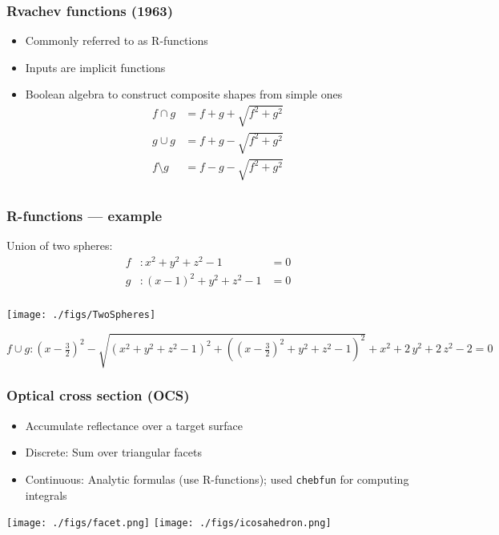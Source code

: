 \documentclass{beamer}
\begin{document}
\begin{frame}[t] 
\frametitle{Rvachev functions (1963)} 
\begin{itemize} 
\item Commonly referred to as R-functions 
\item Inputs are implicit functions
\item Boolean algebra to construct composite shapes from simple ones 
\[
    \begin{aligned}
    f \cap g &= f + g + \sqrt{f^2 + g^2}       \\ 
    g \cup g &= f + g - \sqrt{f^2 + g^2}       \\
    f \setminus g &= f - g - \sqrt{f^2 + g^2}  \\
    \end{aligned}
\]
\end{itemize} 
\end{frame}
\begin{frame}[t] 
\frametitle{R-functions --- example} 
Union of two spheres:
\[
   \begin{aligned}
   f&: x^2+y^2+z^2 - 1 &= 0 \\
   g&: (x-1)^2+y^2+z^2 - 1 &= 0 \\
   \end{aligned}
\]


\begin{center}
{\tiny
\centerline{\texttt{[image: ./figs/TwoSpheres]}} 
\vspace{-3mm}
$
f \cup g: {\left(x-\frac{3}{2}\right)}^2-\sqrt{{\left(x^2+y^2+z^2-1\right)}^2+{\left({\left(x-\frac{3}{2}\right)}^2+y^2+z^2-1\right)}^2}+x^2+2\,y^2+2\,z^2-2 = 0$ 
}
\end{center}
\end{frame} 


\begin{frame}[fragile]
\frametitle{Optical cross section (OCS)}
\begin{itemize}
\item Accumulate reflectance over a target surface
\item Discrete: Sum over triangular facets 
\item Continuous: Analytic formulas (use R-functions); 
used \verb+chebfun+ for computing integrals
\end{itemize}
\centerline{\texttt{[image: ./figs/facet.png]} \: \texttt{[image: ./figs/icosahedron.png]}}
\end{frame}
\end{document}
